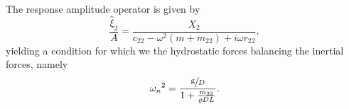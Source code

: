 The response amplitude operator is given by
\[
    \frac{\hat{\xi}_2}{A} = \frac{X_2}{c_{22} - \omega^2 (m + m_{22}) + i \omega r_{22}},
\]
yielding a condition for which we the hydrostatic forces balancing the inertial forces, namely
\[
    {\omega_n}^2 = \frac{\sfrac{\mathrm{g}}{D}}{1 + \frac{m_{22}}{\varrho D L}}.
\]